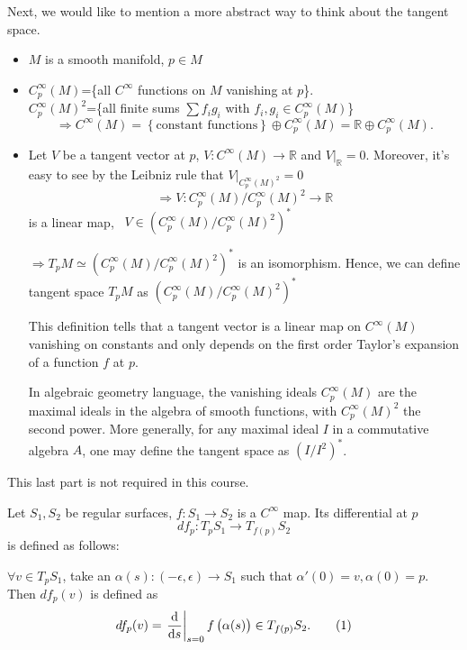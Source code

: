 Next, we would like to mention a more abstract way to think 
about the tangent space.
\begin{itemize}
    \item \(M\) is a smooth manifold, \(p\in M\)
    \item \(C_p^\infty(M)\)=\{all \(C^\infty\) functions
    on \(M\) vanishing at \(p\)\}.\\
    \(C_p^\infty(M)^2\)=\{all finite sums 
    \(\sum f_i g_i \) with \(f_i,g_i\in C_p^\infty(M)\)\}
    \[
        \Rightarrow C^\infty(M)=
        \left\{\text{constant functions}\right\}\oplus 
        C^\infty_p(M)=\mathbb{R}\oplus C^\infty_p(M).     
    \]
    \item Let \(V\) be a tangent vector at \(p\), 
    \(V\colon C^\infty(M)\to \mathbb{R}\) and \(V|_{\mathbb{R}}=0\).
    Moreover, it's easy to see by the Leibniz rule that 
    \(V|_{C_p^\infty(M)^2}=0\)
    \[
          \Rightarrow V\colon C_p^\infty(M)/C_p^\infty(M)^2
          \to \mathbb{R}
    \]
    is a linear map, \ie\ \(V\in 
    \left(C_p^\infty(M)/C_p^\infty(M)^2\right)^*\)

    \(\Rightarrow T_p M\simeq 
    \left(C_p^\infty(M)/C_p^\infty(M)^2\right)^*\)
    is an isomorphism. Hence, we can define tangent space
    \(T_p M\) as 
    \(\left(C_p^\infty(M)/C_p^\infty(M)^2\right)^*\)

    This definition tells that a tangent vector is a linear map 
    on \(C^\infty(M)\) vanishing on constants and only depends 
    on the first order Taylor's expansion of a function \(f\)
    at \(p\).

    In algebraic geometry language, the vanishing ideals 
    \(C^\infty_p(M)\) are the maximal ideals in the algebra
     of smooth functions, with \(C_p^\infty(M)^2\) the second
     power. More generally, for any maximal ideal \(I\) in a 
     commutative algebra \(A\), one may define the tangent space as 
    \(\left(I/I^2\right)^*\).
\end{itemize}
\begin{remark}
    This last part is not required in this course.
\end{remark}
\begin{definition}
    Let \(S_1,S_2\) be regular surfaces, \(f\colon S_1\to S_2\) is a
    \(C^\infty\) map. Its differential at \(p\)
    \[
      df_p\colon T_p S_1\to T_{f(p)}S_2  
    \]
    is defined as follows:

    \(\forall v\in T_p S_1\), take an \(\alpha(s)\colon 
    \left(-\epsilon,\epsilon\right)\to S_1\) such that
    \(\alpha'(0)=v,\alpha(0)=p\). Then \(df_p(v)\) is defined
    as 
    \[
        df_p(v)=\left.\dv{s}\right|_{s=0} f\left(\alpha(s)\right)
         \in T_{f(p)}S_2   .\tag{1}\label{differential of a map}
    \] 
\end{definition}
